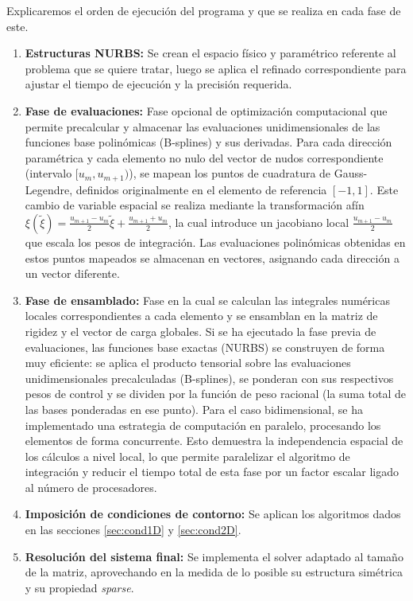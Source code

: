 \documentclass[11pt]{book}
\theoremstyle{plain} %
\theoremstyle{definition} %
\theoremstyle{definition} %
\begin{document}
Explicaremos el orden de ejecución del programa y que se realiza en cada fase de este.

\begin{enumerate}
    \item \textbf{Estructuras NURBS:} Se crean el espacio físico y paramétrico referente al problema que se quiere tratar, luego se aplica el refinado correspondiente para
    ajustar el tiempo de ejecución y la precisión requerida.
    \item \textbf{Fase de evaluaciones:} Fase opcional de optimización computacional que permite precalcular y almacenar las evaluaciones unidimensionales de las funciones base polinómicas
            (B-splines) y sus derivadas. Para cada dirección paramétrica y cada elemento no nulo del vector de nudos correspondiente (intervalo $[u_m, u_{m+1})$), se mapean los puntos de
            cuadratura de Gauss-Legendre, definidos originalmente en el elemento de referencia $[-1, 1]$. Este cambio de variable espacial se realiza mediante la transformación afín
            $\xi(\widetilde{\xi}) = \frac{u_{m+1} - u_m}{2} \widetilde{\xi} + \frac{u_{m+1} + u_m}{2}$, la cual introduce un jacobiano local $\frac{u_{m+1} - u_m}{2}$ que escala los pesos de integración.
            Las evaluaciones polinómicas obtenidas en estos puntos mapeados se almacenan en vectores, asignando cada dirección a un vector diferente.
    \item \textbf{Fase de ensamblado:} Fase en la cual se calculan las integrales numéricas locales correspondientes a cada elemento y se ensamblan en la matriz de rigidez y el vector de carga globales. Si se ha ejecutado la fase previa de evaluaciones, las funciones base exactas (NURBS) se construyen de forma muy eficiente: se aplica el producto tensorial sobre las evaluaciones unidimensionales precalculadas (B-splines), se ponderan con sus respectivos pesos de control y se dividen por la función de peso racional (la suma total de las bases ponderadas en ese punto). Para el caso bidimensional, se ha implementado una estrategia de computación en paralelo, procesando los elementos de forma concurrente. Esto demuestra la independencia espacial de los cálculos a nivel local, lo que permite paralelizar el algoritmo de integración y reducir el tiempo total de esta fase por un factor escalar ligado al número de procesadores.
    \item \textbf{Imposición de condiciones de contorno:} Se aplican los algoritmos dados en las secciones \ref{sec:cond1D} y \ref{sec:cond2D}.
    \item \textbf{Resolución del sistema final:} Se implementa el solver adaptado al tamaño de la matriz, aprovechando en la medida de lo posible su estructura simétrica y su propiedad \textit{sparse}.

\end{enumerate}
\end{document}
